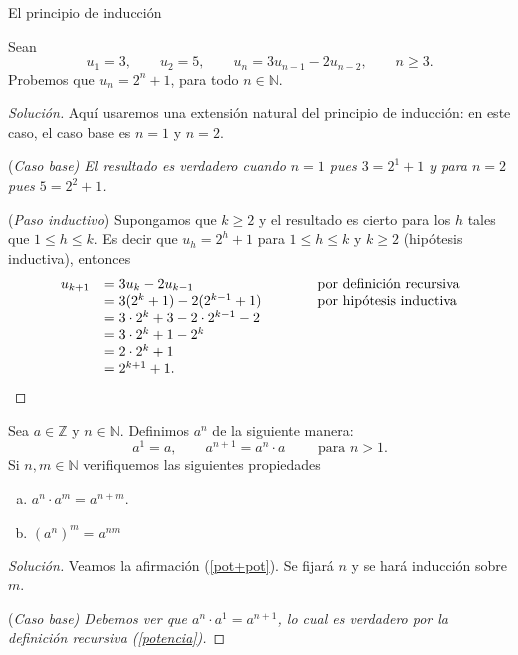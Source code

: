 \begin{section}{El principio de inducción}
\begin{ejemplo}
Sean $$u_1 = 3,\qquad u_2 = 5,\qquad u_n = 3u_{n-1}- 2u_{n-2},\qquad  n \ge 3.$$
Probemos que $u_n = 2^n + 1$, para todo $n \in  \mathbb N$.
\begin{proof}[Solución] Aquí usaremos una extensión natural del principio de inducción: en este caso, el caso base es $n=1$ y $n=2$.

\noindent(\it Caso  base\rm) El resultado es verdadero
cuando $n= 1$ pues $3 = 2^1+1$ y para $n=2$ pues $ 5 =2^2+1$.

\noindent ({\it Paso  inductivo}) Supongamos que $k \ge 2$ y el resultado  es cierto para los $h$ tales que  $1 \le h \le k$. Es decir que $u_h = 2^h+1$ para $1 \le h \le k$ y $k \ge 2$ (hipótesis inductiva), entonces
$$
\begin{matrix} u_{k+1} &= 3u_k -2u_{k-1} \hfill &\qquad &\text{por definición recursiva} \hfill \\
&= 3(2^k+1)-2(2^{k-1}+1) \hfill &\qquad &\text{por hipótesis inductiva}\hfill \\
&= 3\cdot 2^k+3-2\cdot 2^{k-1}-2 \hfill &\qquad & \\
&= 3\cdot 2^k+1- 2^{k} \hfill &\qquad & \\
&= 2\cdot 2^k+1 \hfill &\qquad & \\
&= 2^{k+1}+1. \hfill &\qquad & 
\end{matrix}
$$
\end{proof}
\end{ejemplo}


\begin{ejemplo}
Sea $a \in \mathbb Z$ y $n \in \mathbb N$. Definimos $a^n$ de la siguiente manera:
\begin{equation}\label{potencia}
a^1 = a, \qquad a^{n+1} = a^{n}\cdot a \qquad \text{ para $n >1$.}
\end{equation}
Si $n,m \in \mathbb N$ verifiquemos las siguientes propiedades


\begin{enumerate}[a)]
\item \label{pot+pot} $a^{n} \cdot a^m = a^{n+m}$.
\item \label{potpot} $(a^n)^m = a^{nm}$
\end{enumerate}
\begin{proof}[Solución] 
Veamos la afirmación (\ref{pot+pot}). Se fijará $n$ y se hará inducción sobre $m$. 

\noindent(\it Caso  base\rm) Debemos ver que $a^{n} \cdot a^1 = a^{n+1}$, lo cual es verdadero por la definición recursiva (\ref{potencia}). 


\end{proof}
\end{ejemplo}
\end{section}
